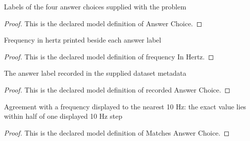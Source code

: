\begin{definition}
  \label{def:physics:phyx-mini-0932:phyxminiproblems-problemphyxmini0932-answerchoice}
  Labels of the four answer choices supplied with the problem
\end{definition}
\begin{proof}
  This is the declared model definition of Answer Choice.
\end{proof}
\begin{definition}
  \label{def:physics:phyx-mini-0932:phyxminiproblems-problemphyxmini0932-answerchoice-frequencyinhertz}
  Frequency in hertz printed beside each answer label
\end{definition}
\begin{proof}
  This is the declared model definition of frequency In Hertz.
\end{proof}
\begin{definition}
  \label{def:physics:phyx-mini-0932:phyxminiproblems-problemphyxmini0932-recordedanswerchoice}
  The answer label recorded in the supplied dataset metadata
\end{definition}
\begin{proof}
  This is the declared model definition of recorded Answer Choice.
\end{proof}
\begin{definition}
  \label{def:physics:phyx-mini-0932:phyxminiproblems-problemphyxmini0932-matchesanswerchoice}
  Agreement with a frequency displayed to the nearest 10 Hz: the exact value lies within half of one displayed 10 Hz step
\end{definition}
\begin{proof}
  This is the declared model definition of Matches Answer Choice.
\end{proof}
